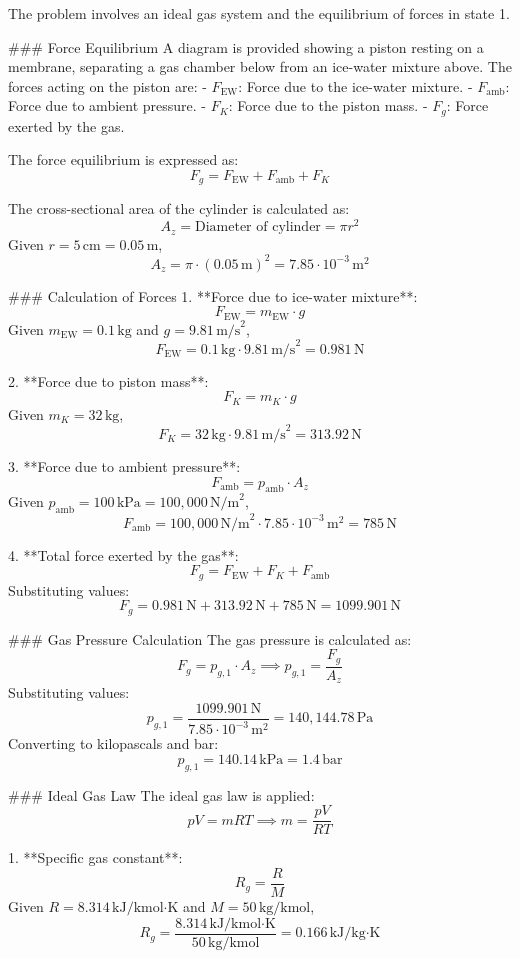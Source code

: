 The problem involves an ideal gas system and the equilibrium of forces in state 1.  

### Force Equilibrium  
A diagram is provided showing a piston resting on a membrane, separating a gas chamber below from an ice-water mixture above. The forces acting on the piston are:  
- \( F_{\text{EW}} \): Force due to the ice-water mixture.  
- \( F_{\text{amb}} \): Force due to ambient pressure.  
- \( F_K \): Force due to the piston mass.  
- \( F_g \): Force exerted by the gas.  

The force equilibrium is expressed as:  
\[
F_g = F_{\text{EW}} + F_{\text{amb}} + F_K
\]

The cross-sectional area of the cylinder is calculated as:  
\[
A_z = \text{Diameter of cylinder} = \pi r^2
\]
Given \( r = 5 \, \text{cm} = 0.05 \, \text{m} \),  
\[
A_z = \pi \cdot (0.05 \, \text{m})^2 = 7.85 \cdot 10^{-3} \, \text{m}^2
\]

### Calculation of Forces  
1. **Force due to ice-water mixture**:  
\[
F_{\text{EW}} = m_{\text{EW}} \cdot g
\]
Given \( m_{\text{EW}} = 0.1 \, \text{kg} \) and \( g = 9.81 \, \text{m/s}^2 \),  
\[
F_{\text{EW}} = 0.1 \, \text{kg} \cdot 9.81 \, \text{m/s}^2 = 0.981 \, \text{N}
\]

2. **Force due to piston mass**:  
\[
F_K = m_K \cdot g
\]
Given \( m_K = 32 \, \text{kg} \),  
\[
F_K = 32 \, \text{kg} \cdot 9.81 \, \text{m/s}^2 = 313.92 \, \text{N}
\]

3. **Force due to ambient pressure**:  
\[
F_{\text{amb}} = p_{\text{amb}} \cdot A_z
\]
Given \( p_{\text{amb}} = 100 \, \text{kPa} = 100,000 \, \text{N/m}^2 \),  
\[
F_{\text{amb}} = 100,000 \, \text{N/m}^2 \cdot 7.85 \cdot 10^{-3} \, \text{m}^2 = 785 \, \text{N}
\]

4. **Total force exerted by the gas**:  
\[
F_g = F_{\text{EW}} + F_K + F_{\text{amb}}
\]
Substituting values:  
\[
F_g = 0.981 \, \text{N} + 313.92 \, \text{N} + 785 \, \text{N} = 1099.901 \, \text{N}
\]

### Gas Pressure Calculation  
The gas pressure is calculated as:  
\[
F_g = p_{g,1} \cdot A_z \implies p_{g,1} = \frac{F_g}{A_z}
\]
Substituting values:  
\[
p_{g,1} = \frac{1099.901 \, \text{N}}{7.85 \cdot 10^{-3} \, \text{m}^2} = 140,144.78 \, \text{Pa}
\]
Converting to kilopascals and bar:  
\[
p_{g,1} = 140.14 \, \text{kPa} = 1.4 \, \text{bar}
\]

### Ideal Gas Law  
The ideal gas law is applied:  
\[
pV = mRT \implies m = \frac{pV}{RT}
\]

1. **Specific gas constant**:  
\[
R_g = \frac{R}{M}
\]
Given \( R = 8.314 \, \text{kJ/kmol·K} \) and \( M = 50 \, \text{kg/kmol} \),  
\[
R_g = \frac{8.314 \, \text{kJ/kmol·K}}{50 \, \text{kg/kmol}} = 0.166 \, \text{kJ/kg·K}
\]

